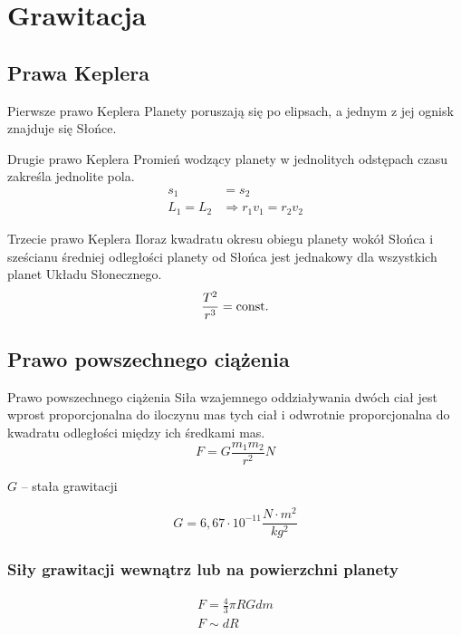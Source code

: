 \chapter{Grawitacja}
  \section{Prawa Keplera}
    \begin{law}{Pierwsze prawo Keplera}
      Planety poruszają się po elipsach, a jednym z jej ognisk znajduje się Słońce.
    \end{law}
    \begin{law}{Drugie prawo Keplera}
      Promień wodzący planety w jednolitych odstępach czasu zakreśla jednolite pola.
      \begin{align*}
        s_1 &= s_2\\
        L_1 = L_2 &\Rightarrow r_1v_1 = r_2v_2
      \end{align*}
    \end{law}
    \begin{law}{Trzecie prawo Keplera}
      Iloraz kwadratu okresu obiegu planety wokół Słońca i sześcianu średniej odległości planety od Słońca jest jednakowy dla wszystkich planet Układu Słonecznego.
      \begin{equation*}
        \frac{T^2}{r^3} = \operatorname{const.}
      \end{equation*}
    \end{law}
  \section{Prawo powszechnego ciążenia}
    \begin{law}{Prawo powszechnego ciążenia}
      Siła wzajemnego oddziaływania dwóch ciał jest wprost proporcjonalna do iloczynu mas tych ciał i odwrotnie proporcjonalna do kwadratu odległości między ich średkami mas.
      \begin{equation}
        F = G\frac{m_1m_2}{r^2} \unit{N}
      \end{equation}
      \begin{symbols}
        \item $G$ -- stała grawitacji
      \end{symbols}
      \begin{equation*}
        G = 6,67\cdot 10^{-11} \unit{\frac{N\cdot m^2}{kg^2}}
      \end{equation*}
    \end{law}
    \subsection{Siły grawitacji wewnątrz lub na powierzchni planety}
      \begin{gather*}
        F = \frac 43\pi RGdm\\
        F \sim dR
      \end{gather*}
